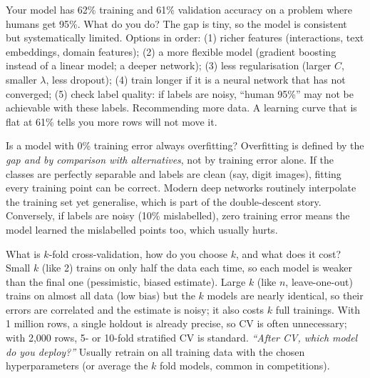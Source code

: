 \begin{qa}{Your model has 62\% training and 61\% validation accuracy on a problem where humans get 95\%. What
do you do?}
\why The gap is tiny, so the model is consistent but systematically limited. Options in order:
(1) richer features (interactions, text embeddings, domain features); (2) a more flexible model (gradient
boosting instead of a linear model; a deeper network); (3) less regularisation (larger $C$, smaller
$\lambda$, less dropout); (4) train longer if it is a neural network that has not converged;
(5) check label quality: if labels are noisy, ``human 95\%'' may not be achievable with these labels.
\pitfall Recommending more data. A learning curve that is flat at 61\% tells you more rows will not move it.
\end{qa}

\begin{qa}{\deep Is a model with 0\% training error always overfitting?}
\why Overfitting is defined by the \emph{gap and by comparison with alternatives}, not by training error alone.
If the classes are perfectly separable and labels are clean (say, digit images), fitting every training point
can be correct. Modern deep networks routinely interpolate the training set yet generalise, which is part of the
double-descent story. Conversely, if labels are noisy (10\% mislabelled), zero training error means the model
learned the mislabelled points too, which usually hurts.
\end{qa}

\begin{qa}{What is $k$-fold cross-validation, how do you choose $k$, and what does it cost?}
\why Small $k$ (like 2) trains on only half the data each time, so each model is weaker than the final one
(pessimistic, biased estimate). Large $k$ (like $n$, leave-one-out) trains on almost all data (low bias) but the
$k$ models are nearly identical, so their errors are correlated and the estimate is noisy; it also costs $k$ full
trainings. With 1 million rows, a single holdout is already precise, so CV is often unnecessary; with 2{,}000
rows, 5- or 10-fold stratified CV is standard.
\pushes \emph{``After CV, which model do you deploy?''} Usually retrain on all training data with the chosen
hyperparameters (or average the $k$ fold models, common in competitions).
\end{qa}

